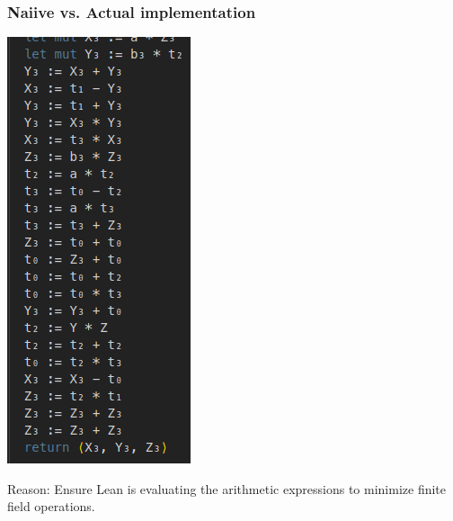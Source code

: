 \documentclass[options]{beamer}
\begin{document}
\begin{frame}
    \frametitle{Naiive vs. Actual implementation}
    \begin{center}
    \includegraphics[height = .70\textheight]{img/screenshot.png}
    \end{center}

    Reason: Ensure Lean is evaluating the arithmetic expressions to minimize finite field operations.
\end{frame}
\end{document}
